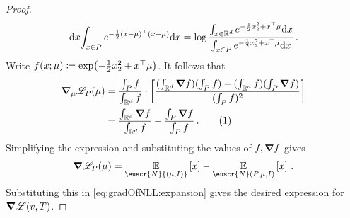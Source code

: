 \documentclass[11pt,letterpaper]{article}
\theoremstyle{plain}
\theoremstyle{definition}
\theoremstyle{remark}
\newcommand{\yesnum}{\addtocounter{equation}{1}\tag{\theequation}}
\newcommand{\inparen}[1]{\ensuremath{\left(#1\right)}}
\newcommand{\insquare}[1]{\ensuremath{\left[#1\right]}}
\let\norm\relax
\newcommand{\norm}[1]{\ensuremath{\left\lVert #1 \right\rVert}}
\newcommand{\R}{\mathbb{R}}
\newcommand{\E}{\operatornamewithlimits{\mathbb{E}}}
\newcommand{\Ex}{\E}
\newcommand{\customcal}[1]{\euscr{#1}}
\newcommand{\cN}{\customcal{N}}
\newcommand{\negLL}{\ensuremath{\mathscr{L}}}
\renewcommand{\d}{{\rm d}}
\newcommand{\normal}[2]{\cN{\inparen{#1,#2}}}
\newcommand{\truncatedNormal}[3]{\cN\inparen{#1,#2,#3}}
\begin{document}
{{{\begin{proof}
\[{{                }\d x
            }{
                \int_{x\in P} e^{
                    -\frac{1}{2}(x-\mu)^\top(x-\mu)
                }\d x
            }
            = 
            \log\frac{
                \int_{x\in \R^d}
                e^{
                    -\frac12 \norm{x}_2^2 + x^\top \mu
                }\d x
            }{
                \int_{x\in P}
                e^{
                    -\frac12 \norm{x}_2^2 + x^\top \mu
                }\d x
            }
            \,.
        \]
        Write $f(x; \mu) \coloneqq \exp(-\frac12 \norm{x}_2^2 + x^\top \mu)$. 
        It follows that 
        \begin{align*}
            \grad_\mu \negLL_P(\mu)
            &= \frac{\int_P f}{\int_{\R^d} f}\cdot \left[ \frac{(\int_{\R^d} \grad f) (\int_P f) - (\int_{\R^d} f)(\int_P \grad f)}{(\int_P f)^2} \right] \\
            &= \frac{\int_{\R^d} \grad f}{\int_{\R^d} f} - \frac{\int_P \grad f}{\int_P f}\,.
            \yesnum\label{eq:gradOfNLL:compressed}
        \end{align*}
        Simplifying the expression and substituting the values of $f, \grad f$ gives
        \[
            \grad \negLL_{P}(\mu) 
            = 
            \Ex_{\normal{\mu}{I}}\insquare{
                    x
            }
            - 
            \Ex_{\truncatedNormal{P}{\mu}{I}}\insquare{
                    x
            }\,.
        \]
        Substituting this in \cref{eq:gradOfNLL:expansion} gives the desired expression for $\grad \negLL(v,T)$.


\end{proof}}}}
\end{document}
